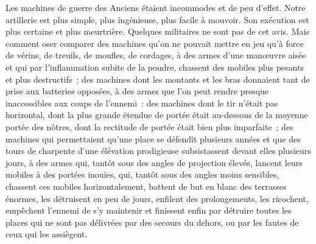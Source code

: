 \documentclass[french,twoside]{book} %
\begin{document}
Les machines de guerre des Anciens étaient incommodes et de peu d’effet. Notre artillerie est plus simple, plus ingénieuse, plus facile à mouvoir. Son exécution est plus certaine et plus meurtrière. Quelques militaires ne sont pas de cet avis. Mais comment oser comparer des machines qu’on ne pouvait mettre en jeu qu’à force de vérins, de treuils, de moufles, de cordages, à des armes d’une manœuvre aisée et qui par l’inflammation subite de la poudre, chassent des mobiles plus pesants et plus destructifs ; des machines dont les montants et les bras donnaient tant de prise aux batteries opposées, à des armes que l’on peut rendre presque inaccessibles aux coups de l’ennemi : des machines dont le tir n’était pas horizontal, dont la plus grande étendue de portée était au-dessous de la moyenne portée des nôtres, dont la rectitude de portée était bien plus imparfaite ; des machines qui permettaient qu’une place se défendît plusieurs années et que des tours de charpente d’une élévation prodigieuse subsistassent devant elles plusieurs jours, à des armes qui, tantôt sous des angles de projection élevés, lancent leurs mobiles à des portées inouïes, qui, tantôt sous des angles moins sensibles, chassent ces mobiles horizontalement, battent de but en blanc des terrasses énormes, les détruisent en peu de jours, enfilent des prolongements, les ricochent, empêchent l’ennemi de s’y maintenir et finissent enfin par détruire toutes les places qui ne sont pas délivrées par des secours du dehors, ou par les fautes de ceux qui les assiègent.\par
\end{document}
